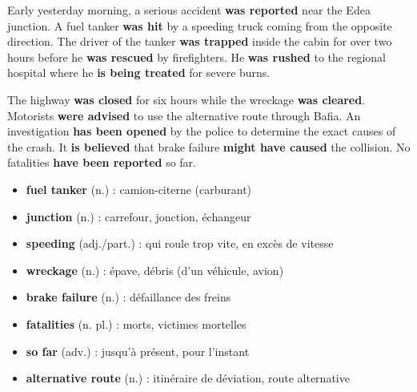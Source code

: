 \documentclass[11pt]{article}
\begin{document}
\begin{textebox}
Early yesterday morning, a serious accident \textbf{was reported} near the Edea junction. A fuel tanker \textbf{was hit} by a speeding truck coming from the opposite direction. The driver of the tanker \textbf{was trapped} inside the cabin for over two hours before he \textbf{was rescued} by firefighters. He \textbf{was rushed} to the regional hospital where he \textbf{is being treated} for severe burns. 

The highway \textbf{was closed} for six hours while the wreckage \textbf{was cleared}. Motorists \textbf{were advised} to use the alternative route through Bafia. An investigation \textbf{has been opened} by the police to determine the exact causes of the crash. It \textbf{is believed} that brake failure \textbf{might have caused} the collision. No fatalities \textbf{have been reported} so far.
\end{textebox}

\begin{definition}
\begin{itemize}
    \item \textbf{fuel tanker} (n.) : camion-citerne (carburant)
    \item \textbf{junction} (n.) : carrefour, jonction, échangeur
    \item \textbf{speeding} (adj./part.) : qui roule trop vite, en excès de vitesse
    \item \textbf{wreckage} (n.) : épave, débris (d'un véhicule, avion)
    \item \textbf{brake failure} (n.) : défaillance des freins
    \item \textbf{fatalities} (n. pl.) : morts, victimes mortelles
    \item \textbf{so far} (adv.) : jusqu'à présent, pour l'instant
    \item \textbf{alternative route} (n.) : itinéraire de déviation, route alternative
\end{itemize}
\end{definition}
\end{document}

